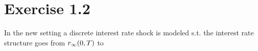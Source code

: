 \section{Exercise 1.2}

In the new setting a discrete interest rate shock is modeled s.t. the interest rate structure goes from $r_{\infty}(0,T)$ to